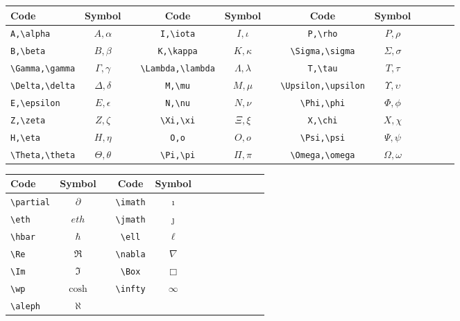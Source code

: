 \documentclass{article}
\begin{document}
\vspace{5mm}

\begin{tabular}{l*{10}{c}r}
	Code & Symbol & \vline & Code & Symbol & \vline & Code & Symbol \\
	\hline
	\verb|A,\alpha| & $A,\alpha$ & \vline & \verb|I,\iota| & $I,\iota$ & \vline & \verb|P,\rho| & $P,\rho$ \\
	\verb|B,\beta| & $B,\beta$ & \vline & \verb|K,\kappa| & $K,\kappa$ & \vline & \verb|\Sigma,\sigma| & $\Sigma,\sigma$ \\
	\verb|\Gamma,\gamma| & $\Gamma,\gamma$ & \vline & \verb|\Lambda,\lambda| & $\Lambda,\lambda$ & \vline & \verb|T,\tau| & $T,\tau$ \\
	\verb|\Delta,\delta| & $\Delta,\delta$ & \vline & \verb|M,\mu| & $M,\mu$ & \vline & \verb|\Upsilon,\upsilon| & $\Upsilon,\upsilon$ \\
	\verb|E,\epsilon| & $E,\epsilon$ & \vline & \verb|N,\nu| & $N,\nu$ & \vline & \verb|\Phi,\phi| & $\Phi,\phi$ \\
	\verb|Z,\zeta| & $Z,\zeta$ & \vline & \verb|\Xi,\xi| & $\Xi,\xi$ & \vline & \verb|X,\chi| & $X,\chi$ \\
	\verb|H,\eta| & $H,\eta$ & \vline & \verb|O,o| & $O,o$ & \vline & \verb|\Psi,\psi| & $\Psi,\psi$ \\
	\verb|\Theta,\theta| & $\Theta,\theta$ & \vline & \verb|\Pi,\pi| & $\Pi,\pi$ & \vline & \verb|\Omega,\omega| & $\Omega,\omega$
\end{tabular}

\vspace{5mm}

\begin{tabular}{l*{10}{c}r}
	Code & Symbol & \vline & Code & Symbol \\
	\hline
	\verb|\partial| & $\partial$ & \vline & \verb|\imath| & $\imath$ \\
	\verb|\eth| & $eth$ & \vline & \verb|\jmath| & $\jmath$ \\
	\verb|\hbar| & $\hbar$ & \vline & \verb|\ell| & $\ell$ \\
	\verb|\Re| & $\Re$ & \vline & \verb|\nabla| & $\nabla$ \\
	\verb|\Im| & $\Im$ & \vline & \verb|\Box| & $\Box$ \\
	\verb|\wp| & $\cosh$ & \vline & \verb|\infty| & $\infty$ \\
	\verb|\aleph| & $\aleph$ & \vline & &
\end{tabular}

\vspace{5mm}
\end{document}
